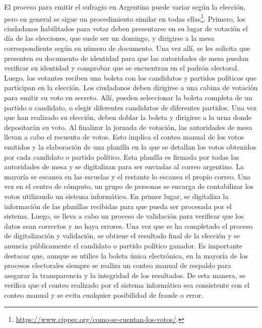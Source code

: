El proceso para emitir el sufragio en Argentina puede variar según la elección, pero en general se sigue un
procedimiento similar en todas
ellas\footnote{\href{https://www.cippec.org/como-se-cuentan-los-votos/}{https://www.cippec.org/como-se-cuentan-los-votos/}.
}. Primero, los ciudadanos habilitados para votar deben presentarse en su lugar de votación el día de las elecciones,
que suele ser un domingo, y dirigirse a la mesa correspondiente según su número de documento. Una vez allí, se les
solicita que presenten su documento de identidad para que las autoridades de mesa puedan verificar su identidad y
comprobar que se encuentran en el padrón electoral. Luego, los votantes reciben una boleta con los candidatos y
partidos políticos que participan en la elección. Los ciudadanos deben dirigirse a una cabina de votación para emitir
su voto en secreto. Allí, pueden seleccionar la boleta completa de un partido o candidato, o elegir diferentes
candidatos de diferentes partidos. Una vez que han realizado su elección, deben doblar la boleta y dirigirse a la urna
donde depositarán su voto. Al finalizar la jornada de votación, las autoridades de mesa llevan a cabo el recuento de
votos. Esto implica el conteo manual de los votos emitidos y la elaboración de una planilla en la que se detallan los
votos obtenidos por cada candidato o partido político. Esta planilla es firmada por todas las autoridades de mesa y se
digitalizan para ser enviadas al correo argentino. La mayoría se escanea en las escuelas y el restante lo escanea el
propio correo. Una vez en el centro de cómputo, un grupo de personas se encarga de contabilizar los votos utilizando un
sistema informático. En primer lugar, se digitaliza la información de las planillas recibidas para que pueda ser
procesada por el sistema. Luego, se lleva a cabo un proceso de validación para verificar que los datos sean correctos y
no haya errores. Una vez que se ha completado el proceso de digitalización y validación, se obtiene el resultado final
de la elección y se anuncia públicamente el candidato o partido político ganador. Es importante destacar que, aunque se
utilice la boleta única electrónica, en la mayoría de los procesos electorales siempre se realiza un conteo manual de
respaldo para asegurar la transparencia y la integridad de los resultados. De esta manera, se verifica que el conteo
realizado por el sistema informático sea consistente con el conteo manual y se evita cualquier posibilidad de fraude o
error.

